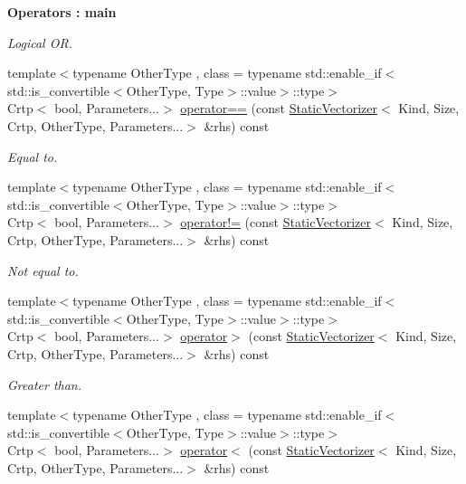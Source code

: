 \begin{Indent}{\bf Operators \-: main}
\begin{DoxyCompactItemize}
\begin{DoxyCompactList}\small\item\em Logical O\-R. \end{DoxyCompactList}\item 
{\footnotesize template$<$typename Other\-Type , class  = typename std\-::enable\-\_\-if$<$std\-::is\-\_\-convertible$<$\-Other\-Type, Type$>$\-::value$>$\-::type$>$ }\\Crtp$<$ bool, Parameters...$>$ \hyperlink{classmagrathea_1_1StaticVectorizer_a5bad4a3e6f2206c1fc71f3f3b26b841b}{operator==} (const \hyperlink{classmagrathea_1_1StaticVectorizer}{Static\-Vectorizer}$<$ Kind, Size, Crtp, Other\-Type, Parameters...$>$ \&rhs) const 
\begin{DoxyCompactList}\small\item\em Equal to. \end{DoxyCompactList}\item 
{\footnotesize template$<$typename Other\-Type , class  = typename std\-::enable\-\_\-if$<$std\-::is\-\_\-convertible$<$\-Other\-Type, Type$>$\-::value$>$\-::type$>$ }\\Crtp$<$ bool, Parameters...$>$ \hyperlink{classmagrathea_1_1StaticVectorizer_af92fdb0640566781b2be44d9e5a13a4f}{operator!=} (const \hyperlink{classmagrathea_1_1StaticVectorizer}{Static\-Vectorizer}$<$ Kind, Size, Crtp, Other\-Type, Parameters...$>$ \&rhs) const 
\begin{DoxyCompactList}\small\item\em Not equal to. \end{DoxyCompactList}\item 
{\footnotesize template$<$typename Other\-Type , class  = typename std\-::enable\-\_\-if$<$std\-::is\-\_\-convertible$<$\-Other\-Type, Type$>$\-::value$>$\-::type$>$ }\\Crtp$<$ bool, Parameters...$>$ \hyperlink{classmagrathea_1_1StaticVectorizer_a2c0b5791efa69c1397ef8af918148ad8}{operator$>$} (const \hyperlink{classmagrathea_1_1StaticVectorizer}{Static\-Vectorizer}$<$ Kind, Size, Crtp, Other\-Type, Parameters...$>$ \&rhs) const 
\begin{DoxyCompactList}\small\item\em Greater than. \end{DoxyCompactList}\item 
{\footnotesize template$<$typename Other\-Type , class  = typename std\-::enable\-\_\-if$<$std\-::is\-\_\-convertible$<$\-Other\-Type, Type$>$\-::value$>$\-::type$>$ }\\Crtp$<$ bool, Parameters...$>$ \hyperlink{classmagrathea_1_1StaticVectorizer_a80928ac25f678a002f96c2770ae0459a}{operator$<$} (const \hyperlink{classmagrathea_1_1StaticVectorizer}{Static\-Vectorizer}$<$ Kind, Size, Crtp, Other\-Type, Parameters...$>$ \&rhs) const 

\end{DoxyCompactItemize}
\end{Indent}
